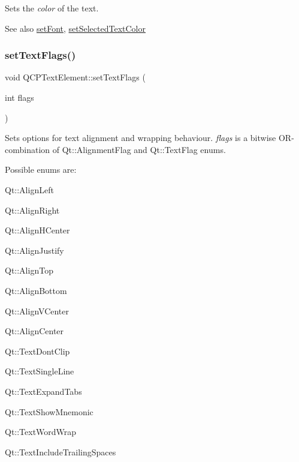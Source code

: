 Sets the {\itshape color} of the text.

\begin{DoxySeeAlso}{See also}
\mbox{\hyperlink{class_q_c_p_text_element_a09b3241769528fa87cb4bf35c97defad}{set\+Font}}, \mbox{\hyperlink{class_q_c_p_text_element_abaec200cae70a0eade53583defc0476d}{set\+Selected\+Text\+Color}} 
\end{DoxySeeAlso}
\mbox{\label{class_q_c_p_text_element_ab908f437f552020888a3ad8cf8242605}} 
\subsubsection{\texorpdfstring{setTextFlags()}{setTextFlags()}}
{\footnotesize\ttfamily void Q\+C\+P\+Text\+Element\+::set\+Text\+Flags (\begin{DoxyParamCaption}\item[{int}]{flags }\end{DoxyParamCaption})}

Sets options for text alignment and wrapping behaviour. {\itshape flags} is a bitwise O\+R-\/combination of {\ttfamily Qt\+::\+Alignment\+Flag} and {\ttfamily Qt\+::\+Text\+Flag} enums.

Possible enums are\+:
\begin{DoxyItemize}
\item Qt\+::\+Align\+Left
\item Qt\+::\+Align\+Right
\item Qt\+::\+Align\+H\+Center
\item Qt\+::\+Align\+Justify
\item Qt\+::\+Align\+Top
\item Qt\+::\+Align\+Bottom
\item Qt\+::\+Align\+V\+Center
\item Qt\+::\+Align\+Center
\item Qt\+::\+Text\+Dont\+Clip
\item Qt\+::\+Text\+Single\+Line
\item Qt\+::\+Text\+Expand\+Tabs
\item Qt\+::\+Text\+Show\+Mnemonic
\item Qt\+::\+Text\+Word\+Wrap
\item Qt\+::\+Text\+Include\+Trailing\+Spaces 
\end{DoxyItemize}\mbox{\label{class_q_c_p_text_element_a453c24723b76fdcae405a8a7b0d02614}} 
